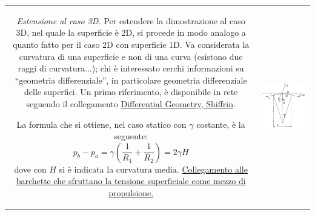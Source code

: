 \begin{tabular}{cc}
\begin{minipage}{0.63\textwidth}
\textit{Estensione al caso 3D.} Per estendere la dimostrazione al caso 3D, nel
quale la superficie è 2D, si procede in modo analogo a quanto fatto per il caso 2D con 
superficie 1D. Va considerata la curvatura di una superficie e non di una curva 
(esistono due raggi di curvatura...); chi è interessato cerchi informazioni su ``geometria differenziale'', in particolare geometria differenziale
 delle superfici. Un primo riferimento, è disponibile in rete
 seguendo il collegamento
\href{http://alpha.math.uga.edu/~shifrin/ShifrinDiffGeo.pdf}
 {Differential Geometry, Shiffrin}.

La formula che si ottiene, nel caso statico con $\gamma$ costante, è la seguente:
\begin{equation}
  p_b - p_a = \gamma \displaystyle\left( \frac{1}{R_1} + \frac{1}{R_2} \right) = 2 \gamma H
\end{equation}
 dove con $H$ si è indicata la curvatura media.
\href{https://www.youtube.com/watch?v=Oz54Auev9eU}{Collegamento alle barchette che sfruttano la tensione superficiale come mezzo di propulsione.}
\end{minipage}
&
\begin{minipage}{0.35\textwidth}
  \begin{center}
    \includegraphics[width=0.95\textwidth]{./fig/laplaceYoung2Ddim.eps}
  \end{center}
\end{minipage}
\end{tabular}
